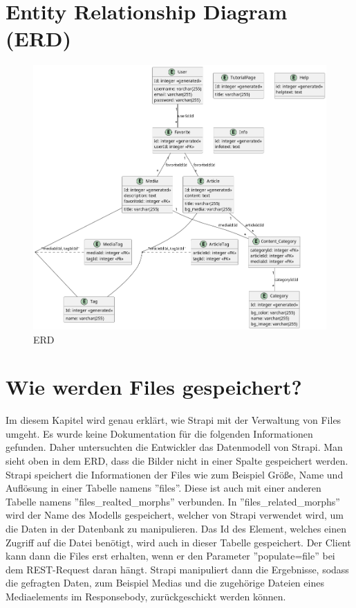 \section{\textbf{E}ntity \textbf{R}elationship \textbf{D}iagram (ERD)}

\begin{figure}[H]
  \centering
  \includegraphics[height=1\textwidth]{./pics/erd.png}
  \caption{ERD}

\end{figure}

\section{Wie werden Files gespeichert?}
Im diesem Kapitel wird genau erklärt, wie Strapi mit der Verwaltung von Files umgeht. Es wurde keine Dokumentation für 
die folgenden Informationen gefunden. Daher untersuchten die Entwickler das Datenmodell von  Strapi.
Man sieht oben in dem ERD,
dass die Bilder nicht in einer Spalte gespeichert werden. Strapi speichert die Informationen der Files wie zum 
Beispiel Größe, Name und Auflösung in einer Tabelle namens ''files''.
Diese ist auch mit einer anderen Tabelle namens ''files\_realted\_morphs'' verbunden. In ''files\_related\_morphs'' wird 
der Name des Modells gespeichert, welcher von Strapi verwendet wird, um die Daten in der Datenbank zu manipulieren. Das 
Id des Element, welches einen Zugriff auf die Datei benötigt, wird auch in dieser Tabelle gespeichert.
Der Client kann dann die Files erst erhalten, wenn er den Parameter ''populate=file'' bei dem REST-Request daran hängt. 
Strapi manipuliert dann die Ergebnisse, sodass die gefragten Daten, zum Beispiel Medias und die zugehörige Dateien eines 
Mediaelements im Responsebody, zurückgeschickt werden können.


